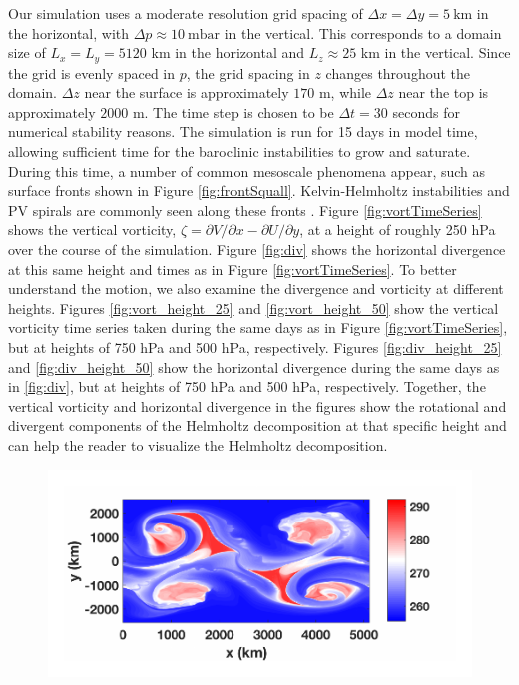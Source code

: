 Our simulation uses a moderate resolution grid spacing of $\Delta x = \Delta y = 5~\text{km}$ in the horizontal, with $\Delta p \approx 10 ~\text{mbar}$ in the vertical. This corresponds to a domain size of $L_x = L_y = 5 120$ km in the horizontal and $L_z \approx 25$ km in the vertical. Since the grid is evenly spaced in $p$, the grid spacing in $z$ changes throughout the domain. $\Delta z$ near the surface is approximately $170$ m, while $\Delta z$ near the top is approximately $2000$ m. The time step is chosen to be $\Delta t = 30$ seconds for numerical stability reasons. The simulation is run for 15 days in model time, allowing sufficient time for the baroclinic instabilities to grow and saturate. During this time, a number of common mesoscale phenomena appear, such as surface fronts shown in Figure \ref{fig:frontSquall}. Kelvin-Helmholtz instabilities and PV spirals are commonly seen along these fronts \cite{Plougonven2013,Methven1998}.  Figure \ref{fig:vortTimeSeries} shows the vertical vorticity, $\zeta = \partial V/\partial x -\partial U/\partial y$, at a height of roughly 250 hPa over the course of the simulation. Figure \ref{fig:div} shows the horizontal divergence at this same height and times as in Figure \ref{fig:vortTimeSeries}. To better understand the motion, we also examine the divergence and vorticity at different heights. Figures \ref{fig:vort_height_25} and \ref{fig:vort_height_50} show the vertical vorticity time series taken during the same days as in Figure \ref{fig:vortTimeSeries}, but at heights of 750 hPa and 500 hPa, respectively. Figures \ref{fig:div_height_25} and \ref{fig:div_height_50} show the horizontal divergence during the same days as in \ref{fig:div}, but at heights of 750 hPa and 500 hPa, respectively. Together, the vertical vorticity and horizontal divergence in the figures show the rotational and divergent components of the Helmholtz decomposition at that specific height and can help the reader to visualize the Helmholtz decomposition.
\\
\begin{figure}[H]
\includegraphics[scale=1]{Chapter3/img/front}
\end{figure}
